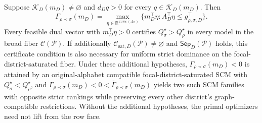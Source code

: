 Suppose \(\mathcal K_D(m_D)\ne\varnothing\) and \(d_Dq>0\) for every \(q\in\mathcal K_D(m_D)\). Then
\[
\Gamma_{\rho\prec\sigma}(m_D)=
\max_{\eta\in\mathbb R^{\operatorname{rows}(A_D)}}
\{m_D^\top\eta:A_D^\top\eta\le g_{\rho,\sigma,D}^\top\}.
\]
Every feasible dual vector with \(m_D^\top\eta>0\) certifies \(Q_\sigma^\star>Q_\rho^\star\) in every model in the broad fiber \(\mathcal C(\mathcal P)\). If additionally \(\mathcal C_{\mathrm{sat},D}(\mathcal P)\ne\varnothing\) and \(\mathsf{Sep}_D(\mathcal P)\) holds, this certificate condition is also necessary for uniform strict dominance on the focal-district-saturated fiber. Under these additional hypotheses, \(\Gamma_{\rho\prec\sigma}(m_D)<0\) is attained by an original-alphabet compatible focal-district-saturated SCM with \(Q_\sigma^\star<Q_\rho^\star\), and \(\Gamma_{\rho\prec\sigma}(m_D)<0<\overline\Gamma_{\rho\prec\sigma}(m_D)\) yields two such SCM families with opposite strict rankings while preserving every other district's graph-compatible restrictions. Without the additional hypotheses, the primal optimizers need not lift from the row face.